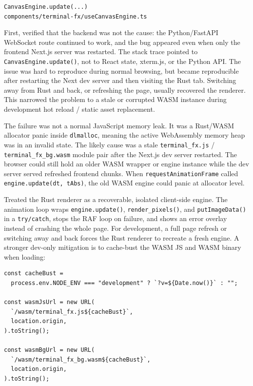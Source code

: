\documentclass[11pt, letterpaper]{article}
\begin{document}
\begin{tcolorbox}[colback=logbg, colframe=logborder, breakable, arc=3pt, boxrule=1pt]
\begin{description}[noitemsep, leftmargin=2cm, style=nextline]
\begin{lstlisting}[style=gitlog]
CanvasEngine.update(...)
components/terminal-fx/useCanvasEngine.ts
  \end{lstlisting}
  \item[\textbf{Diagnosis}] First, verified that the backend was not the cause: the Python/FastAPI WebSocket route continued to work, and the bug appeared even when only the frontend Next.js server was restarted. The stack trace pointed to \texttt{CanvasEngine.update()}, not to React state, xterm.js, or the Python API. The issue was hard to reproduce during normal browsing, but became reproducible after restarting the Next dev server and then visiting the Rust tab. Switching away from Rust and back, or refreshing the page, usually recovered the renderer. This narrowed the problem to a stale or corrupted WASM instance during development hot reload / static asset replacement.
  \item[\textbf{Root Cause}] The failure was not a normal JavaScript memory leak. It was a Rust/WASM allocator panic inside \texttt{dlmalloc}, meaning the active WebAssembly memory heap was in an invalid state. The likely cause was a stale \texttt{terminal\_fx.js} / \texttt{terminal\_fx\_bg.wasm} module pair after the Next.js dev server restarted. The browser could still hold an older WASM wrapper or engine instance while the dev server served refreshed frontend chunks. When \texttt{requestAnimationFrame} called \texttt{engine.update(dt, tAbs)}, the old WASM engine could panic at allocator level.
  \item[\textbf{Fix}] Treated the Rust renderer as a recoverable, isolated client-side engine. The animation loop wraps \texttt{engine.update()}, \texttt{render\_pixels()}, and \texttt{putImageData()} in a \texttt{try/catch}, stops the RAF loop on failure, and shows an error overlay instead of crashing the whole page. For development, a full page refresh or switching away and back forces the Rust renderer to recreate a fresh engine. A stronger dev-only mitigation is to cache-bust the WASM JS and WASM binary when loading:
  \begin{lstlisting}[style=shell]
const cacheBust =
  process.env.NODE_ENV === "development" ? `?v=${Date.now()}` : "";

const wasmJsUrl = new URL(
  `/wasm/terminal_fx.js${cacheBust}`,
  location.origin,
).toString();

const wasmBgUrl = new URL(
  `/wasm/terminal_fx_bg.wasm${cacheBust}`,
  location.origin,
).toString();


\end{lstlisting}
\end{description}
\end{tcolorbox}
\end{document}
